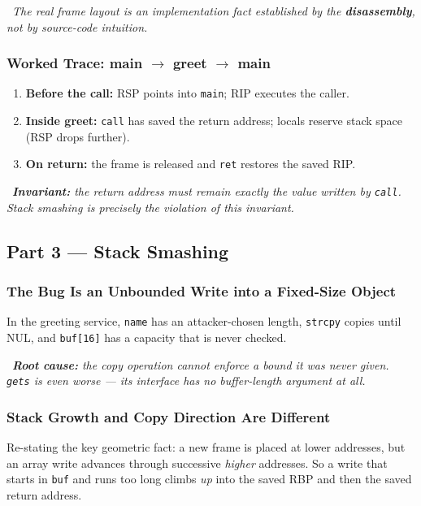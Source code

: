 \documentclass[hidelinks]{article}
\newcommand{\callout}[1]{\par\smallskip\noindent{\color{capri}$\blacktriangleright$}\ \textit{#1}\par\smallskip}
\begin{document}
\callout{The real frame layout is an implementation fact established by the \textbf{disassembly}, not by source-code intuition.}

\subsubsection{Worked Trace: main $\rightarrow$ greet $\rightarrow$ main}

\begin{enumerate}
    \item \textbf{Before the call:} RSP points into \texttt{main}; RIP executes the caller.
    \item \textbf{Inside greet:} \texttt{call} has saved the return address; locals reserve stack space (RSP drops further).
    \item \textbf{On return:} the frame is released and \texttt{ret} restores the saved RIP.
\end{enumerate}

\callout{\textbf{Invariant:} the return address must remain exactly the value written by \texttt{call}. Stack smashing is precisely the violation of this invariant.}

\subsection{Part 3 --- Stack Smashing}

\subsubsection{The Bug Is an Unbounded Write into a Fixed-Size Object}

In the greeting service, \texttt{name} has an attacker-chosen length, \texttt{strcpy} copies until NUL, and \texttt{buf[16]} has a capacity that is never checked.

\callout{\textbf{Root cause:} the copy operation cannot enforce a bound it was never given. \texttt{gets} is even worse --- its interface has no buffer-length argument at all.}

\subsubsection{Stack Growth and Copy Direction Are Different}

Re-stating the key geometric fact: a new frame is placed at lower addresses, but an array write advances through successive \emph{higher} addresses. So a write that starts in \texttt{buf} and runs too long climbs \emph{up} into the saved RBP and then the saved return address.
\end{document}
